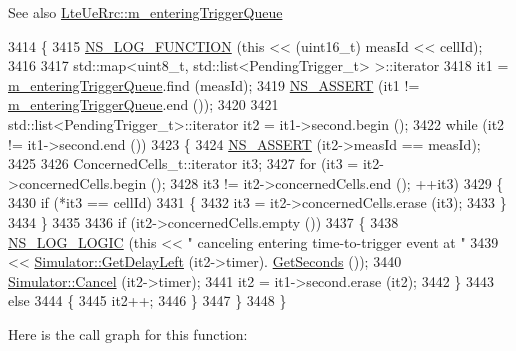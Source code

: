 \begin{DoxySeeAlso}{See also}
\hyperlink{classns3_1_1LteUeRrc_a06a26d8b08a9c635d7fa6ff8381fff4f}{Lte\+Ue\+Rrc\+::m\+\_\+entering\+Trigger\+Queue} 
\end{DoxySeeAlso}

\begin{DoxyCode}
3414 \{
3415   \hyperlink{log-macros-disabled_8h_a90b90d5bad1f39cb1b64923ea94c0761}{NS\_LOG\_FUNCTION} (\textcolor{keyword}{this} << (uint16\_t) measId << cellId);
3416 
3417   std::map<uint8\_t, std::list<PendingTrigger\_t> >::iterator
3418     it1 = \hyperlink{classns3_1_1LteUeRrc_a06a26d8b08a9c635d7fa6ff8381fff4f}{m\_enteringTriggerQueue}.find (measId);
3419   \hyperlink{assert_8h_a6dccdb0de9b252f60088ce281c49d052}{NS\_ASSERT} (it1 != \hyperlink{classns3_1_1LteUeRrc_a06a26d8b08a9c635d7fa6ff8381fff4f}{m\_enteringTriggerQueue}.end ());
3420 
3421   std::list<PendingTrigger\_t>::iterator it2 = it1->second.begin ();
3422   \textcolor{keywordflow}{while} (it2 != it1->second.end ())
3423     \{
3424       \hyperlink{assert_8h_a6dccdb0de9b252f60088ce281c49d052}{NS\_ASSERT} (it2->measId == measId);
3425 
3426       ConcernedCells\_t::iterator it3;
3427       \textcolor{keywordflow}{for} (it3 = it2->concernedCells.begin ();
3428            it3 != it2->concernedCells.end (); ++it3)
3429         \{
3430           \textcolor{keywordflow}{if} (*it3 == cellId)
3431             \{
3432               it3 = it2->concernedCells.erase (it3);
3433             \}
3434         \}
3435 
3436       \textcolor{keywordflow}{if} (it2->concernedCells.empty ())
3437         \{
3438           \hyperlink{group__logging_ga88acd260151caf2db9c0fc84997f45ce}{NS\_LOG\_LOGIC} (\textcolor{keyword}{this} << \textcolor{stringliteral}{" canceling entering time-to-trigger event at "}
3439                              << \hyperlink{classns3_1_1Simulator_af2c7b4285454aa5062bd2df2bb7a7ab9}{Simulator::GetDelayLeft} (it2->timer).
      \hyperlink{classns3_1_1Time_a8f20d5c3b0902d7b4320982f340b57c8}{GetSeconds} ());
3440           \hyperlink{classns3_1_1Simulator_a1b903a62d6117ef28f7ba3c6500689bf}{Simulator::Cancel} (it2->timer);
3441           it2 = it1->second.erase (it2);
3442         \}
3443       \textcolor{keywordflow}{else}
3444         \{
3445           it2++;
3446         \}
3447     \}
3448 \}
\end{DoxyCode}


Here is the call graph for this function\+:


